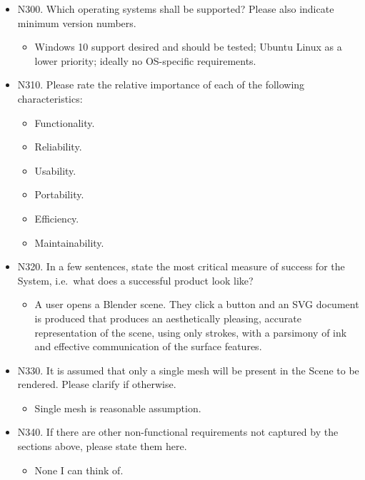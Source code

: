\begin{itemize}
\tightlist
\item
  N300. Which operating systems shall be supported? Please also indicate
  minimum version numbers.

  \begin{itemize}
  \tightlist
  \item
    Windows 10 support desired and should be tested; Ubuntu Linux as a
    lower priority; ideally no OS-specific requirements.
  \end{itemize}
\item
  N310. Please rate the relative importance of each of the following
  characteristics:

  \begin{itemize}
  \tightlist
  \item
    Functionality.
  \item
    Reliability.
  \item
    Usability.
  \item
    Portability.
  \item
    Efficiency.
  \item
    Maintainability.
  \end{itemize}
\item
  N320. In a few sentences, state the most critical measure of success
  for the System, i.e.~what does a successful product look like?

  \begin{itemize}
  \tightlist
  \item
    A user opens a Blender scene. They click a button and an SVG
    document is produced that produces an aesthetically pleasing,
    accurate representation of the scene, using only strokes, with a
    parsimony of ink and effective communication of the surface
    features.
  \end{itemize}
\item
  N330. It is assumed that only a single mesh will be present in the
  Scene to be rendered. Please clarify if otherwise.

  \begin{itemize}
  \tightlist
  \item
    Single mesh is reasonable assumption.
  \end{itemize}
\item
  N340. If there are other non-functional requirements not captured by
  the sections above, please state them here.

  \begin{itemize}
  \tightlist
  \item
    None I can think of.
  \end{itemize}
\end{itemize}

